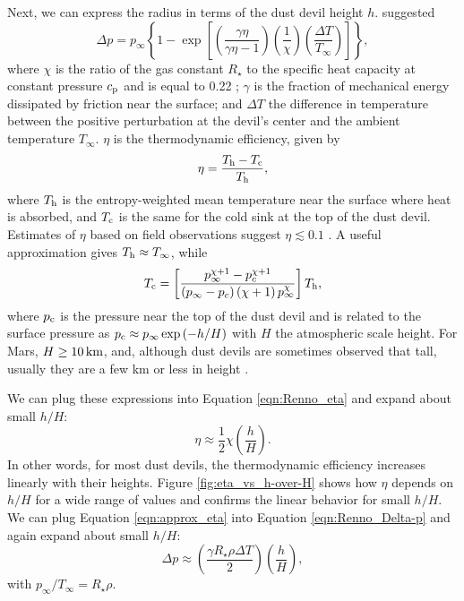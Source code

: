 \documentclass{aastex63}
\begin{document}
Next, we can express the radius in terms of the dust devil height $h$. \citet{1998JAtS...55.3244R} suggested
\begin{equation}
    \Delta p = p_{\infty} \left\{ 1 - \exp \left[ \left( \dfrac{\gamma \eta}{\gamma \eta - 1}\right) \left(\dfrac{1}{\chi}\right) \left( \dfrac{\Delta T}{T_{\infty}}\right) \right] \right\}\label{eqn:Renno_Delta-p},
\end{equation}
where $\chi$ is the ratio of the gas constant $R_\star$ to the specific heat capacity at constant pressure $c_{\rm p}$ and is equal to 0.22 \citep{2000JGR...105.1859R}; $\gamma$ is the fraction of mechanical energy dissipated by friction near the surface; and $\Delta T$ the difference in temperature between the positive perturbation at the devil's center and the ambient temperature $T_\infty$. $\eta$ is the thermodynamic efficiency, given by 
\begin{equation}
    \eta = \dfrac{T_{\rm h} - T_{\rm c}}{T_{\rm h}}\label{eqn:Renno_eta},
\end{equation}{}
where $T_{\rm h}$ is the entropy-weighted mean temperature near the surface where heat is absorbed, and $T_{\rm c}$ is the same for the cold sink at the top of the dust devil. Estimates of $\eta$ based on field observations suggest $\eta \lesssim 0.1$ \citep[e.g.][]{2000JGR...105.1859R}. A useful approximation gives $T_{\rm h} \approx T_\infty$, while
\begin{equation}
    T_{\rm c} = \left[ \dfrac{ p_\infty^{\chi + 1} - p_{c}^{\chi + 1} }{\left( p_\infty - p_{c} \right) \left( \chi + 1\right) p_\infty^{\chi}} \right] T_{\rm h},\label{eqn:Tc}
\end{equation}
where $p_{\rm c}$ is the pressure near the top of the dust devil  \citep{2000JGR...105.1859R} and is related to the surface pressure as $p_{\rm c} \approx p_\infty \exp\left(-h/H\right)$ with $H$ the atmospheric scale height. For Mars, $H \ge 10\,{\rm km}$, and, although dust devils are sometimes observed that tall, usually they are a few km or less in height \citep{2008Icar..197...39S}. 

We can plug these expressions into Equation \ref{eqn:Renno_eta} and expand about small $h/H$:
\begin{equation}
    \eta \approx \frac{1}{2} \chi \left( \dfrac{h}{H} \right).\label{eqn:approx_eta}
\end{equation}
In other words, for most dust devils, the thermodynamic efficiency increases linearly with their heights. Figure \ref{fig:eta_vs_h-over-H} shows how $\eta$ depends on $h/H$ for a wide range of values and confirms the linear behavior for small $h/H$. We can plug Equation \ref{eqn:approx_eta} into Equation \ref{eqn:Renno_Delta-p} and again expand about small $h/H$:
\begin{equation}
    \Delta p \approx \left( \dfrac{\gamma R_\star \rho \Delta T}{2} \right) \left( \dfrac{h}{H} \right) \label{eqn:approx_Delta-p},
\end{equation}
with $p_\infty/T_\infty = R_\star \rho$.
\end{document}
